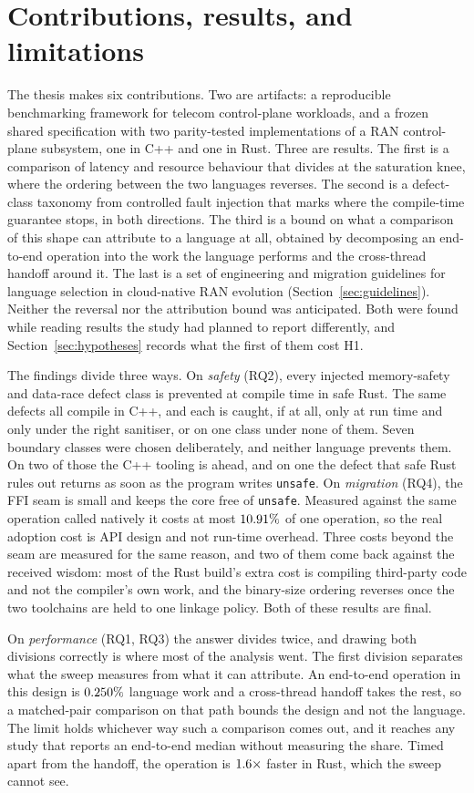 \documentclass[english,oneside,a4paper,censored,csm,software-track-2020]{HYthesisML}
\begin{document}
\section{Contributions, results, and limitations}
The thesis makes six contributions. Two are artifacts: a reproducible benchmarking framework
for telecom control-plane workloads, and a frozen shared specification with two parity-tested
implementations of a RAN control-plane subsystem, one in C++ and one in Rust. Three are
results. The first is a comparison of latency and resource behaviour that divides at the
saturation knee, where the ordering between the two languages reverses. The second is a
defect-class taxonomy from controlled fault injection that marks where the compile-time
guarantee stops, in both directions. The third is a bound on what a comparison of this shape can
attribute to a language at all, obtained by decomposing an end-to-end operation into the work the
language performs and the cross-thread handoff around it. The last is a set of engineering and
migration guidelines for language selection in cloud-native RAN evolution
(Section~\ref{sec:guidelines}). Neither the reversal nor the attribution bound was anticipated.
Both were found while reading results the study had planned to report differently, and
Section~\ref{sec:hypotheses} records what the first of them cost H1.

The findings divide three ways. On \emph{safety} (RQ2), every injected memory-safety and
data-race defect class is prevented at compile time in safe Rust. The same defects all compile
in C++, and each is caught, if at all, only at run time and only under the right sanitiser, or on
one class under none of them. Seven
boundary classes were chosen deliberately, and neither language prevents them. On two of those
the C++ tooling is ahead, and on one the defect that safe Rust rules out returns as soon as the
program writes \texttt{unsafe}. On \emph{migration} (RQ4), the FFI seam is small and keeps the core
free of \texttt{unsafe}. Measured against the same operation called natively it costs at most
$10.91\%$ of one operation, so the real adoption cost is API design and not run-time
overhead. Three costs beyond the seam are measured for the same reason, and two of them come back
against the received wisdom: most of the Rust build's extra cost is compiling third-party code and
not the compiler's own work, and the binary-size ordering reverses once the two toolchains are held
to one linkage policy. Both of these results are final.

On \emph{performance} (RQ1, RQ3) the answer divides twice, and drawing both divisions correctly is
where most of the analysis went. The first division separates what the sweep measures from what it
can attribute. An end-to-end operation in this design is $0.250\%$ language work and
a cross-thread handoff takes the rest, so a matched-pair comparison on that path bounds the design
and not the language. The limit holds whichever way such a comparison comes out, and it reaches
any study that reports an end-to-end median without measuring the share. Timed apart from the
handoff, the operation is $1.6\times$ faster in Rust, which the sweep cannot see.
\end{document}
